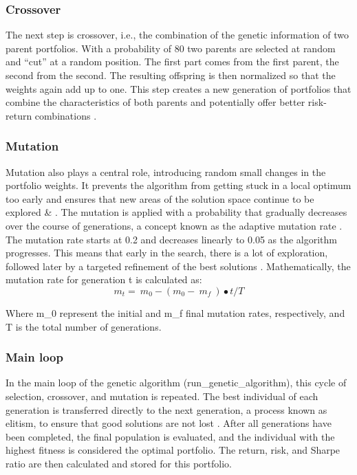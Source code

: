 \documentclass{agasthesis}
\begin{document}
\subsubsection{Crossover}
The next step is crossover, i.e., the combination of the genetic information of two parent portfolios. With a probability of 80%
two parents are selected at random and “cut” at a random position. The first part comes from the first parent, the second from the second. 
The resulting offspring is then normalized so that the weights again add up to one. This step creates a new generation of portfolios that combine 
the characteristics of both parents and potentially offer better risk-return combinations \cite[p. 8-9]{melanie_introduction_1999}.
\subsubsection{Mutation}
Mutation also plays a central role, introducing random small changes in the portfolio weights. It prevents the algorithm from getting stuck in a local 
optimum too early and ensures that new areas of the solution space continue to be explored \cite[p. 129-130]{melanie_introduction_1999} \& \cite[p. 471]{kalayci_review_2017}. 
The mutation is applied with a probability that gradually decreases over the course of generations, a concept known as the adaptive mutation rate \cite[p. 181]{rajakumar_static_2013}. 
The mutation rate starts at 0.2 and decreases linearly to 0.05 as the algorithm progresses. This means that early in the search, there is a lot of exploration, followed later 
by a targeted refinement of the best solutions \cite[p. 181]{rajakumar_static_2013}. Mathematically, the mutation rate for generation t is calculated as:
\[
m_t=\ m_0-(m_0-\ m_f\ )\bullet t/T
\]

Where m_0 represent the initial and m_f final mutation rates, respectively, and T is the total number of generations.
\subsubsection{Main loop}
In the main loop of the genetic algorithm (run_genetic_algorithm), this cycle of selection, crossover, and mutation is repeated. The best individual of each generation is transferred 
directly to the next generation, a process known as elitism, to ensure that good solutions are not lost \cite{deb_fast_2002}. After all generations have been completed, 
the final population is evaluated, and the individual with the highest fitness is considered the optimal portfolio. The return, risk, and Sharpe ratio are then calculated and stored for this portfolio.
\end{document}
